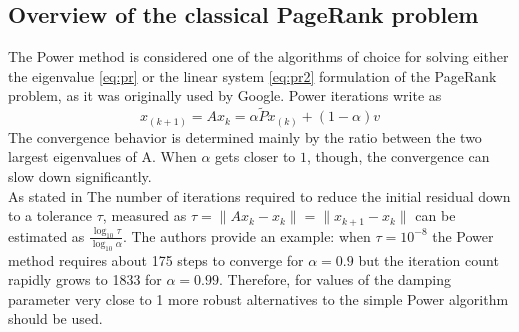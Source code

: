 
\subsection{Overview of the classical PageRank problem}
The Power method is considered one of the algorithms of choice for solving either the eigenvalue \ref{eq:pr} or the linear system \ref{eq:pr2} formulation of the PageRank problem, as it was originally used by Google. Power iterations write as
\begin{equation}\label{eq:power}
    x_{(k+1)} = Ax_k =\alpha \tilde P x_{(k)} + (1 - \alpha)v
\end{equation}
The convergence behavior is determined mainly by the ratio between the two largest eigenvalues of A. When $\alpha$ gets closer to $1$, though, the convergence can slow down significantly. \\

\noindent As stated in \cite{SHEN2022126799} The number of iterations required to reduce the initial residual down to a tolerance $\tau$, measured as $\tau = \lVert Ax_k - x_k \rVert = \lVert x_{k+1} - x_k \rVert$ can be estimated as $\frac{\log_{10} \tau}{\log_{10} \alpha}$. The authors provide an example: when $\tau = 10^{-8}$ the Power method requires about 175 steps to converge for $\alpha = 0.9$ but the iteration count rapidly grows to 1833 for $\alpha = 0.99$. Therefore, for values of the damping parameter very close to 1 more robust alternatives to the simple Power algorithm should be used.

